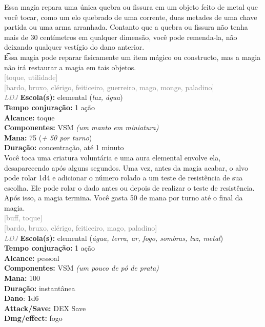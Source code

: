 \documentclass{RPG_Adventure}[2021/10/20]
\begin{document}
{\normalsize Essa magia repara uma única quebra ou fissura em um objeto feito de metal que você tocar, como um elo quebrado de uma corrente, duas metades de uma chave partida ou uma arma arranhada. Contanto que a quebra ou fissura não tenha mais de 30 centímetros em qualquer dimensão, você pode remenda-la, não deixando qualquer vestígio do dano anterior.\\\t Essa magia pode reparar fisicamente um item mágico ou constructo, mas a magia não irá restaurar a magia em tais objetos.\\}
{\scriptsize \textcolor{gray}{[toque, utilidade]\\}}
{\scriptsize \textcolor{gray}{[bardo, bruxo, clérigo, feiticeiro, guerreiro, mago, monge, paladino]\\}}
{\tiny \textcolor{gray}{\textit{LDJ}}}
{\small \t \textbf{Escola(s):} elemental (\textit{luz, água})\\\t \textbf{Tempo conjuração:} 1 ação\\\t \textbf{Alcance:} toque\\\t \textbf{Componentes:} VSM \textit{(um manto em miniatura)}\\\t \textbf{Mana:} 75 (\textit{+ 50 por turno})\\\t \textbf{Duração:} concentração, até 1 minuto\\}
{\normalsize Você toca uma criatura voluntária e uma aura elemental envolve ela, desaparecendo após alguns segundos. Uma vez, antes da magia acabar, o alvo pode rolar 1d4 e adicionar o número rolado a um teste de resistência de sua escolha. Ele pode rolar o dado antes ou depois de realizar o teste de resistência. Após isso, a magia termina. Você gasta 50 de mana por turno até o final da magia.\\}
{\scriptsize \textcolor{gray}{[buff, toque]\\}}
{\scriptsize \textcolor{gray}{[bardo, bruxo, clérigo, feiticeiro, mago, paladino]\\}}
{\tiny \textcolor{gray}{\textit{LDJ}}}
{\small \t \textbf{Escola(s):} elemental (\textit{água, terra, ar, fogo, sombras, luz, metal})\\\t \textbf{Tempo conjuração:} 1 ação\\\t \textbf{Alcance:} pessoal\\\t \textbf{Componentes:} VSM \textit{(um pouco de pó de prata)}\\\t \textbf{Mana:} 100\\\t \textbf{Duração:} instantânea\\\t \textbf{Dano}: 1d6\\\t \textbf{Attack/Save:} DEX Save\\\t \textbf{Dmg/effect:} fogo\\}
\end{document}

